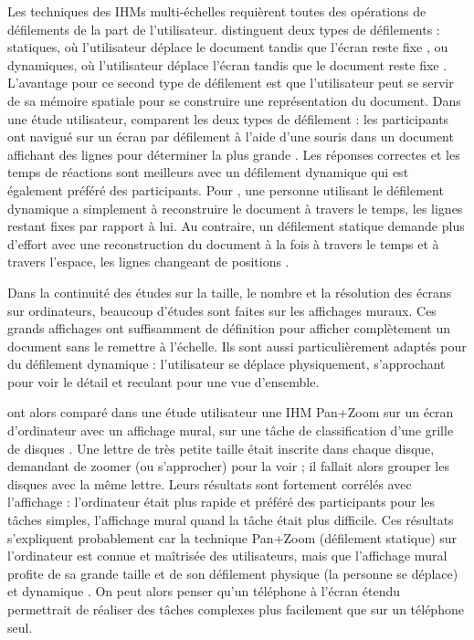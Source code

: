 Les techniques des IHMs multi-échelles requièrent toutes des opérations de défilements de la part de l'utilisateur. \cite{Mehra2006} distinguent deux types de défilements : statiques, où l'utilisateur déplace le document tandis que l'écran reste fixe , ou dynamiques, où l'utilisateur déplace l'écran tandis que le document reste fixe . L'avantage pour ce second type de défilement est que l'utilisateur peut se servir de sa mémoire spatiale pour se construire une représentation du document. Dans une étude utilisateur, \citeauthor{Mehra2006} comparent les deux types de défilement : les participants ont navigué sur un écran par défilement à l'aide d'une souris dans un document affichant des lignes pour déterminer la plus grande . Les réponses correctes et les temps de réactions sont meilleurs avec un défilement dynamique qui est également préféré des participants. Pour \citeauthor{Mehra2006}, une personne utilisant le défilement dynamique a simplement à reconstruire le document à travers le temps, les lignes restant fixes par rapport à lui. Au contraire, un défilement statique demande plus d'effort avec une reconstruction du document à la fois à travers le temps et à travers l'espace, les lignes changeant de positions .

Dans la continuité des études sur la taille, le nombre et la résolution des écrans sur ordinateurs, beaucoup d'études sont faites sur les affichages muraux. Ces grands affichages ont suffisamment de définition pour afficher complètement un document sans le remettre à l'échelle. Ils sont aussi particulièrement adaptés pour du défilement dynamique : l'utilisateur se déplace physiquement, s'approchant pour voir le détail et reculant pour une vue d'ensemble.


\cite{Liu2014} ont alors comparé dans une étude utilisateur une IHM Pan+Zoom sur un écran d'ordinateur avec un affichage mural, sur une tâche de classification d'une grille de disques . Une lettre de très petite taille était inscrite dans chaque disque, demandant de zoomer (ou s'approcher) pour la voir ; il fallait alors grouper les disques avec la même lettre. Leurs résultats sont fortement corrélés avec l'affichage : l'ordinateur était plus rapide et préféré des participants pour les tâches simples, l'affichage mural quand la tâche était plus difficile. Ces résultats s'expliquent probablement car la technique Pan+Zoom (défilement statique) sur l'ordinateur est connue et maîtrisée des utilisateurs, mais que l'affichage mural profite de sa grande taille \citep{Czerwinski2003} et de son défilement physique (la personne se déplace) et dynamique \citep{Mehra2006}. On peut alors penser qu'un téléphone à l'écran étendu permettrait de réaliser des tâches complexes plus facilement que sur un téléphone seul.

